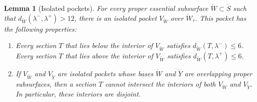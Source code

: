 \documentclass[11pt,letterpaper]{amsart}
\newcommand{\mr}{\mathring}
\newcommand{\psub}{\mr W}
\numberwithin{equation}{section}
\newtheorem{lemma}[theorem]{Lemma}
\theoremstyle{definition}
\begin{document}
\begin{lemma}[Isolated pockets]\label{Lem:IsolatedPocket}
For every proper essential subsurface $\psub \subset \mr S$ such that $d_{\psub}(\lambda^-, \lambda^+) > 12$, there is an isolated pocket $V_{\psub}$ over $\psub_\tau$. This pocket has the following properties:
\begin{enumerate}
\item\label{Itm:SectionDistBelow} Every section $T$ that lies below the interior of $V_{\psub}$ satisfies $d_{\psub}(T, \lambda^-) \leq 6$.
Every section $T$ that lies above the interior of $V_{\psub}$ satisfies $d_{\psub}(T, \lambda^+) \leq 6$.
%
\item\label{Itm:IsolatedDisjointness} If $V_{\psub}$ and $V_{\mr Y}$ are isolated pockets whose bases $\psub$ and ${\mr Y}$ are overlapping proper subsurfaces, then a section $T$ cannot intersect the interiors of both $V_{\psub}$ and $V_{\mr Y}$. In particular, these interiors are disjoint.
\end{enumerate}
\end{lemma}
\end{document}
